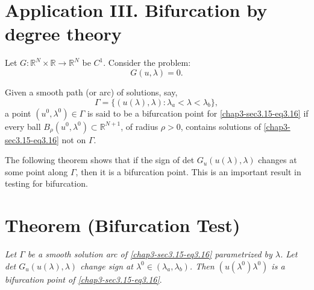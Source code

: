 \section*{Application III. Bifurcation by degree theory}

\begin{defi*}
Let $G : \mathbb{R}^N \times \mathbb{R} \to \mathbb{R}^N$ be
$C^1$. Consider the problem:  
\begin{equation*}
G(u, \lambda) = 0. \tag{3.16}\label{chap3-sec3.15-eq3.16}
\end{equation*}

Given a smooth path (or arc) of solutions, say,
$$
\Gamma = \{ (u (\lambda) , \lambda) : \lambda_a < \lambda < \lambda_b
\}, 
$$
a point $(u^0, \lambda^0) \in \Gamma$ is said to be a
bifurcation point for \eqref{chap3-sec3.15-eq3.16} if every ball
$B_{\rho}(u^0, \lambda^0) 
\subset \mathbb{R}^{N+1}$, of radius $\rho > 0$, contains solutions of
\eqref{chap3-sec3.15-eq3.16} not on $\Gamma$. 

The following theorem shows that if the sign of det $G_u(u(\lambda),
\lambda)$ changes at some point along $\Gamma$, then it is a
bifurcation point. This is an important result in testing for
bifurcation. 
\end{defi*}

\setcounter{section}{16}
\section{Theorem (Bifurcation Test)}\label{chap3-sec3.17}%

\textit{Let $\Gamma$ be a smooth solution arc of
  \eqref{chap3-sec3.15-eq3.16} 
  parametrized by $\lambda$. Let det $G_u(u(\lambda),\lambda)$ change
  sign at $\lambda^0 \in(\lambda_a , \lambda_b)$. Then
  $(u(\lambda^0) \lambda^0)$ is  a bifurcation point of
  \eqref{chap3-sec3.15-eq3.16}}.  


